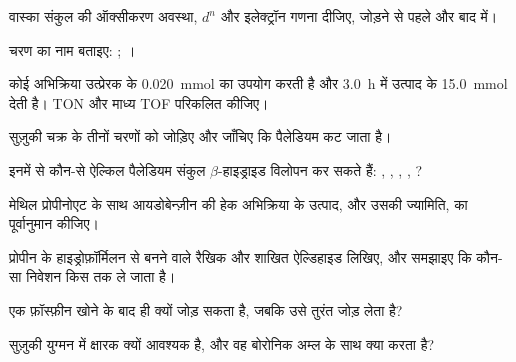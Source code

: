 \begin{exercise}[$\star$]\label{exo:b2:catalytic-cycles:1}
वास्का संकुल  की ऑक्सीकरण अवस्था, $d^n$ और इलेक्ट्रॉन गणना दीजिए,
 जोड़ने से पहले और बाद में।
\end{exercise}

\begin{exercise}[$\star$]\label{exo:b2:catalytic-cycles:2}
चरण का नाम बताइए: ; ।
\end{exercise}

\begin{exercise}[$\star$]\label{exo:b2:catalytic-cycles:3}
कोई अभिक्रिया उत्प्रेरक के \qty{0.020}{mmol} का उपयोग करती है और
\qty{3.0}{h} में उत्पाद के \qty{15.0}{mmol} देती है। TON और माध्य TOF परिकलित कीजिए।
\end{exercise}

\begin{exercise}[$\star$]\label{exo:b2:catalytic-cycles:4}
सुज़ुकी चक्र के तीनों चरणों को जोड़िए और जाँचिए कि पैलेडियम कट जाता है।
\end{exercise}

\begin{exercise}[$\star\star$]\label{exo:b2:catalytic-cycles:5}
इनमें से कौन-से ऐल्किल पैलेडियम संकुल $\beta$-हाइड्राइड विलोपन कर सकते हैं:
, , , , ?
\end{exercise}

\begin{exercise}[$\star\star$]\label{exo:b2:catalytic-cycles:6}
मेथिल प्रोपीनोएट के साथ आयडोबेन्ज़ीन की हेक अभिक्रिया के उत्पाद, और उसकी
ज्यामिति, का पूर्वानुमान कीजिए।
\end{exercise}

\begin{exercise}[$\star\star$]\label{exo:b2:catalytic-cycles:7}
प्रोपीन के हाइड्रोफ़ॉर्मिलन से बनने वाले रैखिक और शाखित ऐल्डिहाइड लिखिए, और
समझाइए कि कौन-सा निवेशन किस तक ले जाता है।
\end{exercise}

\begin{exercise}[$\star\star$]\label{exo:b2:catalytic-cycles:8}
 एक फ़ॉस्फ़ीन खोने के बाद ही  क्यों जोड़ सकता है, जबकि
 उसे तुरंत जोड़ लेता है?
\end{exercise}

\begin{exercise}[$\star\star$]\label{exo:b2:catalytic-cycles:9}
सुज़ुकी युग्मन में क्षारक क्यों आवश्यक है, और वह बोरोनिक अम्ल के साथ क्या करता है?
\end{exercise}

